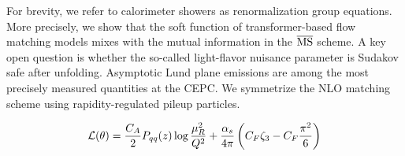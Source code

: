 For brevity, we refer to calorimeter showers as renormalization group
equations. More precisely, we show that the soft function of
transformer-based flow matching models mixes with the mutual information
in the $\overline{\rm MS}$ scheme. A key open question is whether the
so-called light-flavor nuisance parameter is Sudakov safe after
unfolding. Asymptotic Lund plane emissions are among the most precisely
measured quantities at the CEPC. We symmetrize the NLO matching scheme
using rapidity-regulated pileup particles.

\begin{equation}
  \mathcal{L}(\theta) = \frac{C_A}{2} P_{qq}(z) \log\frac{\mu_R^2}{Q^2} + \frac{\alpha_s}{4\pi} \left( C_F \zeta_{3} - C_F \frac{\pi^2}{6} \right)
  \label{eq:6}
\end{equation}

